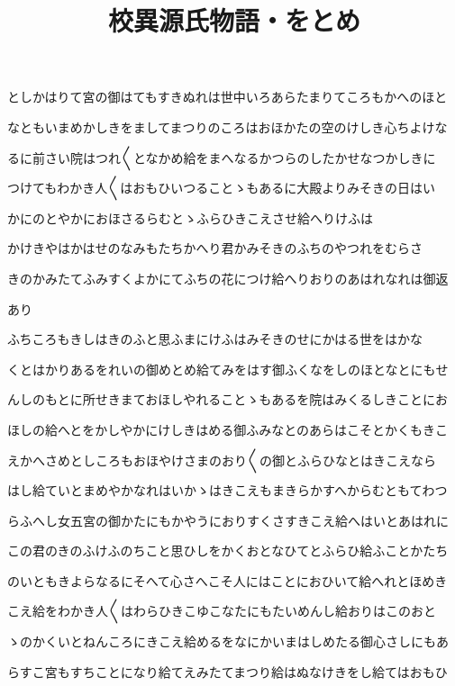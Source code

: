 \documentclass[a4paper,11pt,landscape]{ltjtarticle}
\title{校異源氏物語・をとめ}
\date{}
\begin{document}
\maketitle

としかはりて宮の御はてもすきぬれは世中いろあらたまりてころもかへのほと
\par\medskip
なともいまめかしきをましてまつりのころはおほかたの空のけしき心ちよけな
\par\medskip
るに前さい院はつれ〱となかめ給をまへなるかつらのしたかせなつかしきに
\par\medskip
つけてもわかき人〱はおもひいつることゝもあるに大殿よりみそきの日はい
\par\medskip
かにのとやかにおほさるらむとゝふらひきこえさせ給へりけふは
\par\medskip
かけきやはかはせのなみもたちかへり君かみそきのふちのやつれをむらさ
\par\medskip
きのかみたてふみすくよかにてふちの花につけ給へりおりのあはれなれは御返
\par\medskip
あり
\par\medskip
ふちころもきしはきのふと思ふまにけふはみそきのせにかはる世をはかな
\par\medskip
くとはかりあるをれいの御めとめ給てみをはす御ふくなをしのほとなとにもせ
\par\medskip
んしのもとに所せきまておほしやれることゝもあるを院はみくるしきことにお
\par\medskip
ほしの給へとをかしやかにけしきはめる御ふみなとのあらはこそとかくもきこ
\par\medskip
えかへさめとしころもおほやけさまのおり〱の御とふらひなとはきこえなら
\par\medskip
はし給ていとまめやかなれはいかゝはきこえもまきらかすへからむともてわつ
\par\medskip
らふへし女五宮の御かたにもかやうにおりすくさすきこえ給へはいとあはれに
\par\medskip
この君のきのふけふのちこと思ひしをかくおとなひてとふらひ給ふことかたち
\par\medskip
のいともきよらなるにそへて心さへこそ人にはことにおひいて給へれとほめき
\par\medskip
こえ給をわかき人〱はわらひきこゆこなたにもたいめんし給おりはこのおと
\par\medskip
ゝのかくいとねんころにきこえ給めるをなにかいまはしめたる御心さしにもあ
\par\medskip
らすこ宮もすちことになり給てえみたてまつり給はぬなけきをし給てはおもひ
\par\medskip
\end{document}
